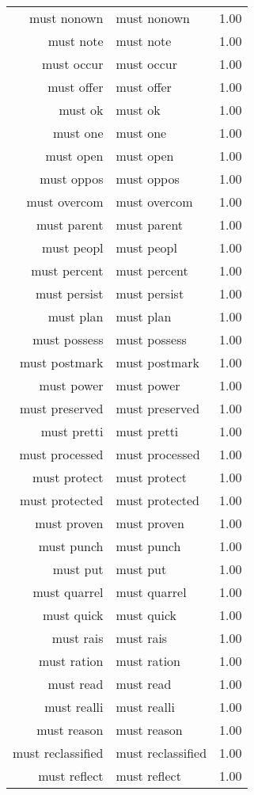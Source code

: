 \begin{table}[ht]
\begin{tabular}{rlr}
  must nonown & must nonown & 1.00 \\ 
  must note & must note & 1.00 \\ 
  must occur & must occur & 1.00 \\ 
  must offer & must offer & 1.00 \\ 
  must ok & must ok & 1.00 \\ 
  must one & must one & 1.00 \\ 
  must open & must open & 1.00 \\ 
  must oppos & must oppos & 1.00 \\ 
  must overcom & must overcom & 1.00 \\ 
  must parent & must parent & 1.00 \\ 
  must peopl & must peopl & 1.00 \\ 
  must percent & must percent & 1.00 \\ 
  must persist & must persist & 1.00 \\ 
  must plan & must plan & 1.00 \\ 
  must possess & must possess & 1.00 \\ 
  must postmark & must postmark & 1.00 \\ 
  must power & must power & 1.00 \\ 
  must preserved & must preserved & 1.00 \\ 
  must pretti & must pretti & 1.00 \\ 
  must processed & must processed & 1.00 \\ 
  must protect & must protect & 1.00 \\ 
  must protected & must protected & 1.00 \\ 
  must proven & must proven & 1.00 \\ 
  must punch & must punch & 1.00 \\ 
  must put & must put & 1.00 \\ 
  must quarrel & must quarrel & 1.00 \\ 
  must quick & must quick & 1.00 \\ 
  must rais & must rais & 1.00 \\ 
  must ration & must ration & 1.00 \\ 
  must read & must read & 1.00 \\ 
  must realli & must realli & 1.00 \\ 
  must reason & must reason & 1.00 \\ 
  must reclassified & must reclassified & 1.00 \\ 
  must reflect & must reflect & 1.00 \\ 

\end{tabular}
\end{table}
